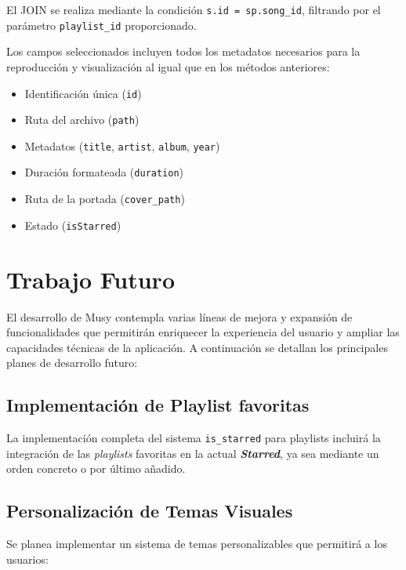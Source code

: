 \documentclass[11pt, a4paper]{article}
\begin{document}
            El JOIN se realiza mediante la condición \verb|s.id = sp.song_id|, filtrando por el parámetro \verb|playlist_id| proporcionado.

            Los campos seleccionados incluyen todos los metadatos necesarios para la reproducción y visualización al igual que en los métodos anteriores:
            \begin{itemize}
              \item Identificación única (\verb|id|)
              \item Ruta del archivo (\verb|path|)
              \item Metadatos (\verb|title|, \verb|artist|, \verb|album|, \verb|year|)
              \item Duración formateada (\verb|duration|)
              \item Ruta de la portada (\verb|cover_path|)
              \item Estado (\verb|isStarred|)
            \end{itemize}

\section{Trabajo Futuro}

El desarrollo de Musy contempla varias líneas de mejora y expansión de funcionalidades que permitirán enriquecer la experiencia del usuario y ampliar las capacidades técnicas de la aplicación. A continuación se detallan los principales planes de desarrollo futuro:

  \subsection{Implementación de Playlist favoritas}

  La implementación completa del sistema \verb|is_starred| para playlists incluirá la integración de las \textit{playlists} favoritas en la actual \textbf{\textit{Starred}}, ya sea mediante un orden concreto o por último añadido.

  \subsection{Personalización de Temas Visuales}
  Se planea implementar un sistema de temas personalizables que permitirá a los usuarios:
\end{document}
